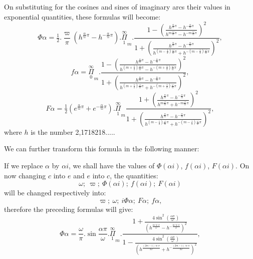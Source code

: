 \documentclass{article}
\begin{document}
On substituting for the cosines and sines of imaginary arcs their values in exponential quantities, these formulas will become:
\[
\Phi\alpha = \tfrac{1}{2}.\frac{\varpi}{\pi}\left(h^{\frac{\alpha}{\varpi}\pi}-h^{-\frac{\alpha}{\varpi}\pi}\right).\overset{\infty}{\underset{1}{\Pi}}_{m}.\frac{1-\left(\frac{h^{\frac{\alpha}{\varpi}\pi}-h^{-\frac{\alpha}{\varpi}\pi}}{h^{m\frac{\omega}{\varpi}\pi}-h^{-m\frac{\omega}{\varpi}\pi}}\right)^{2}}{1+\left(\frac{h^{\frac{\alpha}{\varpi}\pi}-h^{-\frac{\alpha}{\varpi}\pi}}{h^{(m-\frac{1}{2})\frac{\omega}{\varpi}\pi}+h^{-(m-\frac{1}{2})\frac{\omega}{\varpi}\pi}}\right)^{2}},
\tag{184.}
\]
\[
f\alpha = \overset{\infty}{\underset{0}{\Pi}}_{m}.\frac{1-\left(\frac{h^{\frac{\alpha}{\varpi}\pi}-h^{-\frac{\alpha}{\varpi}\pi}}{h^{(m+\frac{1}{2})\frac{\omega}{\varpi}\pi}-h^{-(m+\frac{1}{2})\frac{\omega}{\varpi}\pi}}\right)^{2}}{1+\left(\frac{h^{\frac{\alpha}{\varpi}\pi}-h^{-\frac{\alpha}{\varpi}\pi}}{h^{(m+\frac{1}{2})\frac{\omega}{\varpi}\pi}+h^{-(m+\frac{1}{2})\frac{\omega}{\varpi}\pi}}\right)^{2}},
\tag{185.}
\]
\[
F\alpha = \tfrac{1}{2}\left(e^{\frac{\alpha}{\varpi}\pi}+e^{-\frac{\alpha}{\varpi}\pi}\right).\overset{\infty}{\underset{1}{\Pi}}_{m}\frac{1+\left(\frac{h^{\frac{\alpha}{\varpi}\pi}-h^{-\frac{\alpha}{\varpi}\pi}}{h^{m\frac{\omega}{\varpi}\pi}+h^{-m\frac{\omega}{\varpi}\pi}}\right)^{2}}{1+\left(\frac{h^{\frac{\alpha}{\varpi}\pi}-h^{-\frac{\alpha}{\varpi}\pi}}{h^{(m-\frac{1}{2})\frac{\omega}{\varpi}\pi}+h^{-(m-\frac{1}{2})\frac{\omega}{\varpi}\pi}}\right)^{2}},
\tag{186.}
\]
where $h$ is the number 2,1718218.....
 

We can further transform this formula in the following manner:

If we replace $\alpha$ by $\alpha i$, we shall have the values of $\Phi(\alpha i)$, $f(\alpha i)$, $F(\alpha i)$. On now changing $c$ into $e$ and $e$ into $c$, the quantities:
\[
\omega;\ \varpi;\ \Phi(\alpha i);\ f(\alpha i);\ F(\alpha i)
\]
will be changed respectively into:
\[
\varpi;\ \omega;\ i\Phi\alpha;\ F\alpha;\ f\alpha,
\]
therefore the preceding formulas will give:
\[
\Phi\alpha = \frac{\omega}{\pi}.\sin\frac{\alpha\pi}{\omega}.\overset{\infty}{\underset{1}{\Pi}}_{m}.\frac{1+\frac{4\sin^{2}\left(\frac{\alpha\pi}{\omega}\right)}{\left(h^{\frac{m\varpi\pi}{\omega}}-h^{-\frac{m\varpi\pi}{\omega}}\right)^{2}}}{1-\frac{4\sin^{2}\left(\frac{\alpha\pi}{\omega}\right)}{\left(h^{\frac{(2m-1)\varpi\pi}{2\omega}}+h^{-\frac{(2m-1)\varpi\pi}{2\omega}}\right)^{2}}},
\tag{187.}
\]
\end{document}

